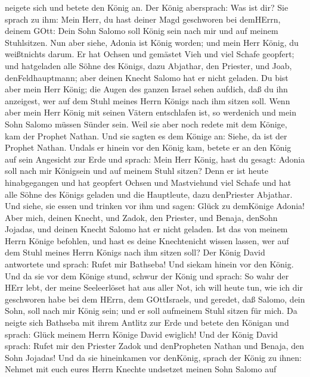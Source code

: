 neigete sich und betete den König an. Der König abersprach: Was ist dir?
 Sie sprach zu ihm: Mein Herr, du hast deiner Magd
geschworen bei demHErrn, deinem GOtt: Dein Sohn Salomo soll König sein
nach mir und auf meinem Stuhlsitzen.  Nun aber siehe,
Adonia ist König worden; und mein Herr König, du weißtnichts darum.
 Er hat Ochsen und gemästet Vieh und viel Schafe geopfert;
und hatgeladen alle Söhne des Königs, dazu Abjathar, den Priester, und
Joab, denFeldhauptmann; aber deinen Knecht Salomo hat er nicht geladen.
 Du bist aber mein Herr König; die Augen des ganzen Israel
sehen aufdich, daß du ihn anzeigest, wer auf dem Stuhl meines Herrn
Königs nach ihm sitzen soll.  Wenn aber mein Herr König mit
seinen Vätern entschlafen ist, so werdenich und mein Sohn Salomo müssen
Sünder sein.  Weil sie aber noch redete mit dem Könige, kam
der Prophet Nathan.  Und sie sagten es dem Könige an:
Siehe, da ist der Prophet Nathan. Undals er hinein vor den König kam,
betete er an den König auf sein Angesicht zur Erde  und
sprach: Mein Herr König, hast du gesagt: Adonia soll nach mir Königsein
und auf meinem Stuhl sitzen?  Denn er ist heute
hinabgegangen und hat geopfert Ochsen und Mastviehund viel Schafe und
hat alle Söhne des Königs geladen und die Hauptleute, dazu denPriester
Abjathar. Und siehe, sie essen und trinken vor ihm und sagen: Glück zu
demKönige Adonia!  Aber mich, deinen Knecht, und Zadok, den
Priester, und Benaja, denSohn Jojadas, und deinen Knecht Salomo hat er
nicht geladen.  Ist das von meinem Herrn Könige befohlen,
und hast es deine Knechtenicht wissen lassen, wer auf dem Stuhl meines
Herrn Königs nach ihm sitzen soll?  Der König David
antwortete und sprach: Rufet mir Bathseba! Und siekam hinein vor den
König. Und da sie vor dem Könige stund,  schwur der König
und sprach: So wahr der HErr lebt, der meine Seeleerlöset hat aus aller
Not,  ich will heute tun, wie ich dir geschworen habe bei
dem HErrn, dem GOttIsraels, und geredet, daß Salomo, dein Sohn, soll
nach mir König sein; und er soll aufmeinem Stuhl sitzen für mich.
 Da neigte sich Bathseba mit ihrem Antlitz zur Erde und
betete den Königan und sprach: Glück meinem Herrn Könige David ewiglich!
 Und der König David sprach: Rufet mir den Priester Zadok
und denPropheten Nathan und Benaja, den Sohn Jojadas! Und da sie
hineinkamen vor denKönig,  sprach der König zu ihnen:
Nehmet mit euch eures Herrn Knechte undsetzet meinen Sohn Salomo auf

